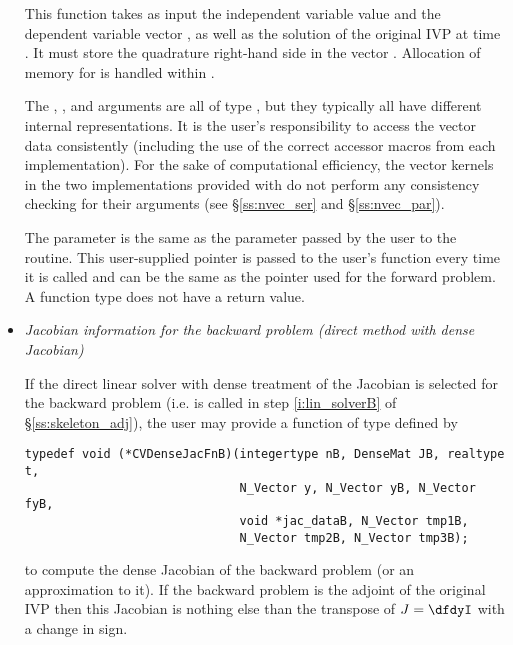 \begin{itemize}
  This function takes as input the 
  independent variable value  and the dependent variable vector ,
  as well as the solution of the original IVP  at time .  
  It must store the quadrature right-hand side in the vector .  
  Allocation of memory for  is handled within {\cvodes}.
  
  The , , and  arguments are all of type ,
  but they  typically all have different internal representations. It is the user's 
  responsibility to access the vector data consistently (including the use of the 
  correct accessor macros from each {\nvector} implementation). For the sake of 
  computational efficiency, the vector kernels in the two {\nvector} implementations 
  provided with {\cvodes} do not perform any consistency checking for their 
   arguments (see \S\ref{ss:nvec_ser} and \S\ref{ss:nvec_par}).

  The  parameter is the same as the  parameter passed by 
  the user to the  routine. This user-supplied pointer is passed to 
  the user's  function every time it is called and can be the same as the 
   pointer used for the forward problem.
  A  function type does not have a return value.

\item {\em Jacobian information for the backward problem
    (direct method with dense Jacobian)}
  
  If the direct linear solver with dense treatment of the Jacobian is selected
  for the backward problem (i.e.  is called in step \ref{i:lin_solverB} 
  of \S\ref{ss:skeleton_adj}), the user may provide a function of type  
  defined by
\begin{verbatim}
typedef void (*CVDenseJacFnB)(integertype nB, DenseMat JB, realtype t, 
                              N_Vector y, N_Vector yB, N_Vector fyB,
                              void *jac_dataB, N_Vector tmp1B,
                              N_Vector tmp2B, N_Vector tmp3B);
\end{verbatim}
  to compute the dense Jacobian of the backward problem (or an approximation
  to it). If the backward problem is the adjoint of the original IVP then
  this Jacobian is nothing else than the transpose of $J = \dfdyI$ with
  a change in sign.


\end{itemize}
